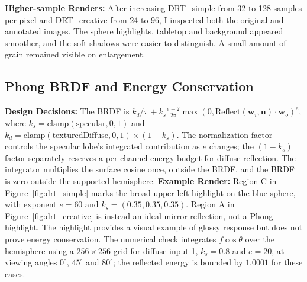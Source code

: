 \documentclass[11pt,a4paper]{article}
\begin{document}
\textbf{Higher-sample Renders:} After increasing DRT\_simple from 32 to 128 samples per pixel and DRT\_creative from 24 to 96, I inspected both the original and annotated images. The sphere highlights, tabletop and background appeared smoother, and the soft shadows were easier to distinguish. A small amount of grain remained visible on enlargement.

\subsection{Phong BRDF and Energy Conservation}
\textbf{Design Decisions:} The BRDF is \( k_d/\pi + k_s \frac{e+2}{2\pi} \max(0, \text{Reflect}(\mathbf{w}_i, \mathbf{n}) \cdot \mathbf{w}_o)^e \), where \( k_s = \text{clamp}(\text{specular}, 0, 1) \) and \( k_d = \text{clamp}(\text{texturedDiffuse}, 0, 1) \times (1-k_s) \). The normalization factor controls the specular lobe's integrated contribution as $e$ changes; the $(1-k_s)$ factor separately reserves a per-channel energy budget for diffuse reflection. The integrator multiplies the surface cosine once, outside the BRDF, and the BRDF is zero outside the supported hemisphere.
\textbf{Example Render:}
Region C in Figure~\ref{fig:drt_simple} marks the broad upper-left highlight on the blue sphere, with exponent $e=60$ and $k_s=(0.35,0.35,0.35)$. Region A in Figure~\ref{fig:drt_creative} is instead an ideal mirror reflection, not a Phong highlight. The highlight provides a visual example of glossy response but does not prove energy conservation. The numerical check integrates $f\cos\theta$ over the hemisphere using a $256\times256$ grid for diffuse input 1, $k_s=0.8$ and $e=20$, at viewing angles $0^\circ$, $45^\circ$ and $80^\circ$; the reflected energy is bounded by $1.0001$ for these cases.
\end{document}
